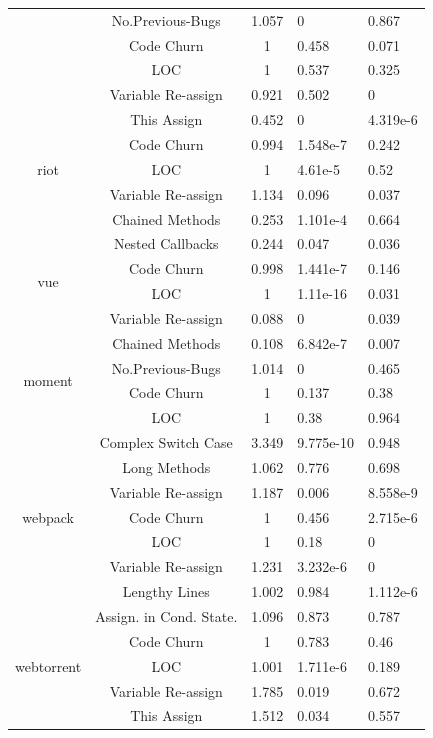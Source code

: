 \documentclass[smallcondensed]{svjour3}
\begin{document}
\begin{table}[t]
\begin{tabular}{c|c|c|p{1.1cm}|p{1.3cm}}
		& No.Previous-Bugs & 1.057 & 0 & 0.867 \\ \cline{2-5}
		& Code Churn & 1 & 0.458 & 0.071 \\ \cline{2-5}
		& LOC & 1 & 0.537 & 0.325 \\ \cline{2-5}
		& Variable Re-assign & 0.921 & 0.502 & 0 \\ \cline{2-5}
		& This Assign & 0.452 & 0 & 4.319e-6 \\ \hline
		\multirow{3}{*}{riot}
		& Code Churn & 0.994 & 1.548e-7 & 0.242 \\ \cline{2-5}
		& LOC & 1 & 4.61e-5 & 0.52 \\ \cline{2-5}
		& Variable Re-assign & 1.134 & 0.096 & 0.037 \\ \cline{2-5}
		& Chained Methods & 0.253 & 1.101e-4 & 0.664 \\ \cline{2-5}
		& Nested Callbacks & 0.244 & 0.047 & 0.036 \\ \hline
		\multirow{2}{*}{vue}
		& Code Churn & 0.998 & 1.441e-7 & 0.146 \\ \cline{2-5}
		& LOC & 1 & 1.11e-16 & 0.031 \\ \cline{2-5}
		& Variable Re-assign & 0.088 & 0 & 0.039 \\ \cline{2-5}
		& Chained Methods & 0.108 & 6.842e-7 & 0.007 \\ \hline
		\multirow{2}{*}{moment}
		& No.Previous-Bugs & 1.014 & 0 & 0.465 \\ \cline{2-5}
		& Code Churn & 1 & 0.137 & 0.38 \\ \cline{2-5}
		& LOC & 1 & 0.38 & 0.964 \\ \cline{2-5}
		& Complex Switch Case & 3.349 & 9.775e-10 & 0.948 \\ \cline{2-5}
		& Long Methods & 1.062 & 0.776 & 0.698 \\ \cline{2-5}
		& Variable Re-assign & 1.187 & 0.006 & 8.558e-9 \\ \hline
		\multirow{1}{*}{webpack}
		& Code Churn & 1 & 0.456 & 2.715e-6 \\ \cline{2-5}
		& LOC & 1 & 0.18 & 0 \\ \cline{2-5}
		& Variable Re-assign & 1.231 & 3.232e-6 & 0 \\ \cline{2-5}
		& Lengthy Lines & 1.002 & 0.984 & 1.112e-6 \\ \cline{2-5}
		& Assign. in Cond. State. & 1.096 & 0.873 & 0.787 \\ \hline
		\multirow{3}{*}{webtorrent}
		& Code Churn & 1 & 0.783 & 0.46 \\ \cline{2-5}
		& LOC & 1.001 & 1.711e-6 & 0.189 \\ \cline{2-5}
		& Variable Re-assign & 1.785 & 0.019 & 0.672 \\ \cline{2-5}
		& This Assign & 1.512 & 0.034 & 0.557 \\ \hline
	\end{tabular}
	\label{smelltypes2}
	\vspace{-15pt}
\end{table}
\end{document}
